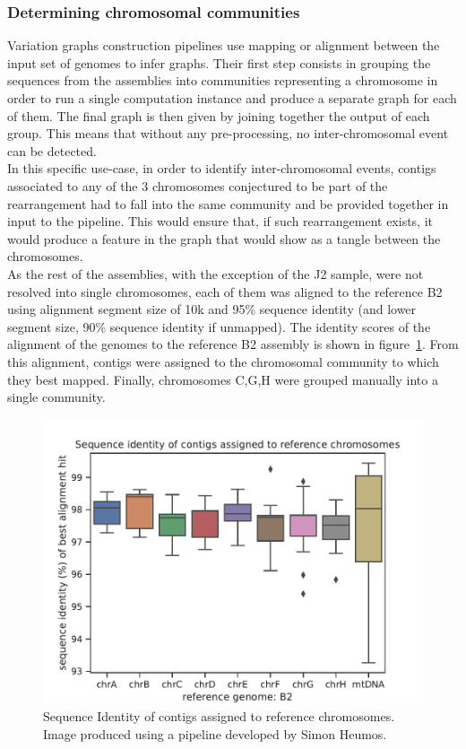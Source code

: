 \subsubsection{Determining chromosomal communities}
Variation graphs construction pipelines use mapping or alignment between the input set of genomes to infer graphs. Their first step consists in grouping the sequences from the assemblies into communities representing a chromosome in order to run a single computation instance and produce a separate graph for each of them. The final graph is then given by joining together the output of each group. This means that without any pre-processing, no inter-chromosomal event can be detected.\\ 
In this specific use-case, in order to identify inter-chromosomal events, contigs associated to any of the 3 chromosomes conjectured to be part of the rearrangement had to fall into the same community and be provided together in input to the pipeline. This would ensure that, if such rearrangement exists, it would produce a feature in the graph that would show as a tangle between the chromosomes.\\
As the rest of the assemblies, with the exception of the J2 sample, were not resolved into single chromosomes, each of them was aligned to the reference B2 using \wfmash alignment segment size of 10k and 95\% sequence identity (and lower segment size, 90\% sequence identity if unmapped). The identity scores of the alignment of the genomes to the reference B2 assembly is shown in figure~\ref{fig:lodelo_alignment_scores}. From this alignment, contigs were assigned to the chromosomal community to which they best mapped. Finally, chromosomes C,G,H were grouped manually into a single community.
\begin{figure}[h!]
	\centering
	\includegraphics[width=.8\linewidth]{figures/lodelo/Alignment_scores.pdf}
	\caption[Sequence Identity of \lodelo samples's contigs assigned to reference chromosomes.]{Sequence Identity of contigs assigned to reference chromosomes. Image produced using a pipeline developed by Simon Heumos.}
	\label{fig:lodelo_alignment_scores}
\end{figure}

